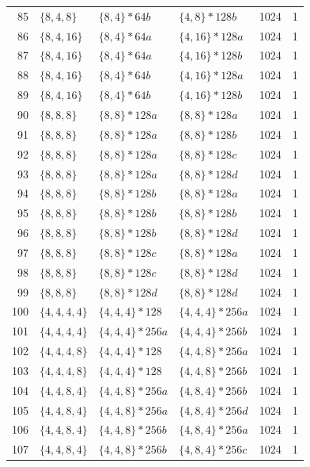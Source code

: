 \begin{longtable}{rllllr}
85 & \(\{8,4,8\}\) & \(\{8,4\}\!\ast 64b\) & \(\{4,8\}\!\ast 128b\) & 1024 & 1 \\
86 & \(\{8,4,16\}\) & \(\{8,4\}\!\ast 64a\) & \(\{4,16\}\!\ast 128a\) & 1024 & 1 \\
87 & \(\{8,4,16\}\) & \(\{8,4\}\!\ast 64a\) & \(\{4,16\}\!\ast 128b\) & 1024 & 1 \\
88 & \(\{8,4,16\}\) & \(\{8,4\}\!\ast 64b\) & \(\{4,16\}\!\ast 128a\) & 1024 & 1 \\
89 & \(\{8,4,16\}\) & \(\{8,4\}\!\ast 64b\) & \(\{4,16\}\!\ast 128b\) & 1024 & 1 \\
90 & \(\{8,8,8\}\) & \(\{8,8\}\!\ast 128a\) & \(\{8,8\}\!\ast 128a\) & 1024 & 1 \\
91 & \(\{8,8,8\}\) & \(\{8,8\}\!\ast 128a\) & \(\{8,8\}\!\ast 128b\) & 1024 & 1 \\
92 & \(\{8,8,8\}\) & \(\{8,8\}\!\ast 128a\) & \(\{8,8\}\!\ast 128c\) & 1024 & 1 \\
93 & \(\{8,8,8\}\) & \(\{8,8\}\!\ast 128a\) & \(\{8,8\}\!\ast 128d\) & 1024 & 1 \\
94 & \(\{8,8,8\}\) & \(\{8,8\}\!\ast 128b\) & \(\{8,8\}\!\ast 128a\) & 1024 & 1 \\
95 & \(\{8,8,8\}\) & \(\{8,8\}\!\ast 128b\) & \(\{8,8\}\!\ast 128b\) & 1024 & 1 \\
96 & \(\{8,8,8\}\) & \(\{8,8\}\!\ast 128b\) & \(\{8,8\}\!\ast 128d\) & 1024 & 1 \\
97 & \(\{8,8,8\}\) & \(\{8,8\}\!\ast 128c\) & \(\{8,8\}\!\ast 128a\) & 1024 & 1 \\
98 & \(\{8,8,8\}\) & \(\{8,8\}\!\ast 128c\) & \(\{8,8\}\!\ast 128d\) & 1024 & 1 \\
99 & \(\{8,8,8\}\) & \(\{8,8\}\!\ast 128d\) & \(\{8,8\}\!\ast 128d\) & 1024 & 1 \\
100 & \(\{4,4,4,4\}\) & \(\{4,4,4\}\!\ast 128\) & \(\{4,4,4\}\!\ast 256a\) & 1024 & 1 \\
101 & \(\{4,4,4,4\}\) & \(\{4,4,4\}\!\ast 256a\) & \(\{4,4,4\}\!\ast 256b\) & 1024 & 1 \\
102 & \(\{4,4,4,8\}\) & \(\{4,4,4\}\!\ast 128\) & \(\{4,4,8\}\!\ast 256a\) & 1024 & 1 \\
103 & \(\{4,4,4,8\}\) & \(\{4,4,4\}\!\ast 128\) & \(\{4,4,8\}\!\ast 256b\) & 1024 & 1 \\
104 & \(\{4,4,8,4\}\) & \(\{4,4,8\}\!\ast 256a\) & \(\{4,8,4\}\!\ast 256b\) & 1024 & 1 \\
105 & \(\{4,4,8,4\}\) & \(\{4,4,8\}\!\ast 256a\) & \(\{4,8,4\}\!\ast 256d\) & 1024 & 1 \\
106 & \(\{4,4,8,4\}\) & \(\{4,4,8\}\!\ast 256b\) & \(\{4,8,4\}\!\ast 256a\) & 1024 & 1 \\
107 & \(\{4,4,8,4\}\) & \(\{4,4,8\}\!\ast 256b\) & \(\{4,8,4\}\!\ast 256c\) & 1024 & 1 \\
\end{longtable}
\normalsize

